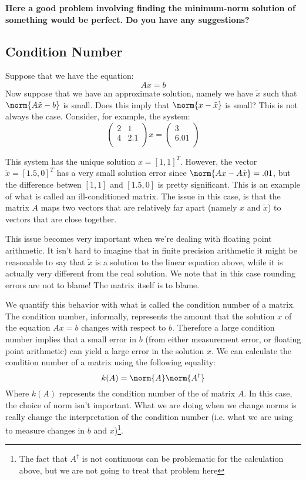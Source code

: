 {\bf Here a good problem involving finding the minimum-norm solution of something would be perfect. Do you have any suggestions?}

\subsection*{Condition Number}

Suppose that we have the equation:
\[
Ax= b
\]
Now suppose that we have an approximate solution, namely we have $\tilde{x}$ such that $\norm{A\tilde{x} -b}$ is small. Does this imply that $\norm{x-\tilde{x}}$ is small? This is not always the case. Consider, for example, the system:
\[
\begin{pmatrix}
2 & 1\\
4 & 2.1 \\
\end{pmatrix} x = 
\begin{pmatrix}
3 \\
6.01\\
\end{pmatrix}
\]

This system has the unique solution $x = [1, 1]^T$. However, the vector $\tilde{x} = [1.5, 0]^T$ has a very small solution error since $\norm{Ax-A\tilde{x}} = .01$, but the difference betwen $[1, 1]$ and $[1.5, 0]$ is pretty significant. This is an example of what is called an ill-conditioned matrix. The issue in this case, is that the matrix $A$ maps two vectors that are relatively far apart (namely $x$ and $\tilde{x}$) to vectors that are close together.

This issue becomes very important when we're dealing with floating point arithmetic. It isn't hard to imagine that in finite precision arithmetic it might be reasonable to say that $\tilde{x}$ is a solution to the linear equation above, while it is actually very different from the real solution. We note that in this case rounding errors are not to blame! The matrix itself is to blame.

We quantify this behavior with what is called the condition number of a matrix. The condition number, informally, represents the amount that the solution $x$ of the equation $Ax = b$ changes with respect to $b$. Therefore a large condition number implies that a small error in $b$ (from either measurement error, or floating point arithmetic) can yield a large error in the solution $x$. We can calculate the condition number of a matrix using the following equality:
\[
k(A) = \norm{A} \norm{A^\dagger}
\]
Where $k(A)$ represents the condition number of the of matrix $A$. In this case, the choice of norm isn't important. What we are  doing when we change norms is really change the interpretation of the condition number (i.e. what we are using to measure changes in $b$ and $x$)\footnote{The fact that $A^\dagger$ is not continuous can be problematic for the calculation above, but we are not going to treat that problem here}.

